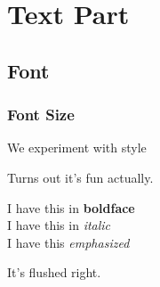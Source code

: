 \documentclass[12pt]{article}  %
\begin{document}
\begin{titlepage}

\begin{huge}

\begin{center}


\end{center}



\end{huge}

\end{titlepage}

\renewcommand{\contentsname}{List of Contents}


\tableofcontents

\title{\color{green}{Hello World in \LaTeX \ Document}}
\author{\color{blue}{Sary}}
\date{\today}
\maketitle

\section{Text Part}
	\subsection{Font}
		\subsubsection{Font Size}
\begin{flushleft}
We experiment with style\
\end{flushleft}
Turns out it's fun actually.
\begin{center}
I have this in \textbf{boldface}\\
I have this in \textit{italic}\\
I have this \emph{emphasized}\\
\end{center}

\begin{flushright}
It's flushed right.
\end{flushright}

 
\end{document}
